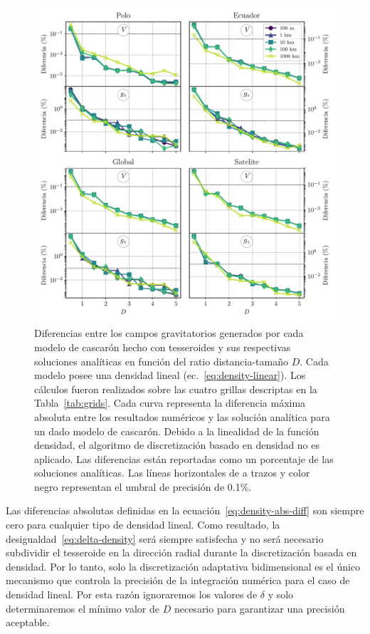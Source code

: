 \begin{figure}
\centering
\includegraphics[width=\linewidth]{figs/tesseroids-variable-density/linear-density-diffs.pdf}
\caption{
    Diferencias entre los campos gravitatorios generados por cada modelo de
    cascarón hecho con tesseroides y sus respectivas soluciones analíticas en
    función del ratio distancia-tamaño $D$.
    Cada modelo posee una densidad lineal (ec.~\ref{eq:density-linear}).
    Los cálculos fueron realizados sobre las cuatro grillas descriptas en la
    Tabla~\ref{tab:grids}.
    Cada curva representa la diferencia máxima absoluta entre los resultados
    numéricos y las solución analítica para un dado modelo de cascarón.
    Debido a la linealidad de la función densidad, el algoritmo de
    discretización basado en densidad no es aplicado.
    Las diferencias están reportadas como un porcentaje de las soluciones
    analíticas.
    Las líneas horizontales de a trazos y color negro representan el umbral de
    precisión de 0.1\%.
}
\label{fig:D-linear}
\end{figure}

Las diferencias absolutas definidas en la ecuación~\ref{eq:density-abs-diff}
son siempre cero para cualquier tipo de densidad lineal.
Como resultado, la desigualdad~\ref{eq:delta-density} será siempre satisfecha
y no será necesario subdividir el tesseroide en la dirección radial durante la
discretización basada en densidad.
Por lo tanto, solo la discretización adaptativa bidimensional es el único
mecanismo que controla la precisión de la integración numérica para el caso de
densidad lineal.
Por esta razón ignoraremos los valores de $\delta$ y solo determinaremos el
mínimo valor de $D$ necesario para garantizar una precisión aceptable.

